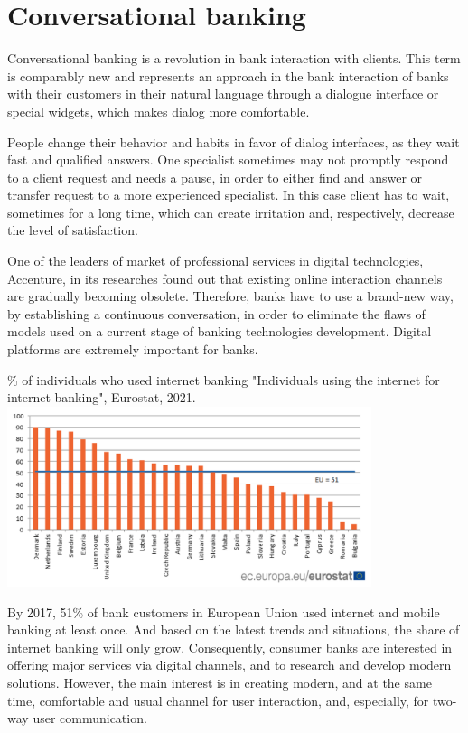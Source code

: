 
\section{Conversational banking}

Conversational banking is a revolution in bank interaction with clients.
This term is comparably new and represents an approach in the bank interaction of banks with their customers in their natural language through a dialogue interface or special widgets, which makes dialog more comfortable.

People change their behavior and habits in favor of dialog interfaces, as they wait fast and qualified answers.
One specialist sometimes may not promptly respond to a client request and needs a pause, in order to either find and answer or transfer request to a more experienced specialist.
In this case client has to wait, sometimes for a long time, which can create irritation and, respectively, decrease the level of satisfaction.

One of the leaders of market of professional services in digital technologies, Accenture, in its researches found out that existing online interaction channels are gradually becoming obsolete.
Therefore, banks have to use a brand-new way, by establishing a continuous conversation, in order to eliminate the flaws of models used on a current stage of banking technologies development.
Digital platforms are extremely important for banks.
\cite{accenture_conversational_banking}

\mtfigure
{\% of individuals who used internet banking}
{"Individuals using the internet for internet banking", Eurostat, 2021.}
{
    \includegraphics[width=0.8\textwidth,height=\textheight,keepaspectratio]{images/share_internet_banking.png}
}

By 2017, 51\% of bank customers in European Union used internet and mobile banking at least once.
And based on the latest trends and situations, the share of internet banking will only grow.
Consequently, consumer banks are interested in offering major services via digital channels, and to research and develop modern solutions.
However, the main interest is in creating modern, and at the same time, comfortable and usual channel for user interaction, and, especially, for two-way user communication.

